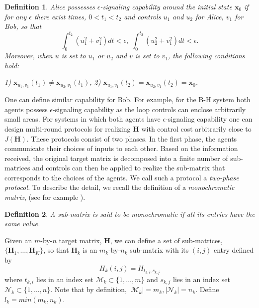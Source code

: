 \documentclass[12pt,onecolumn,draftcls]{IEEEtran}
\newcommand{\bx}{\mathbf{x}}
\newcommand{\bH}{\mathbf{H}}
\newtheorem{definition}{Definition}[section]
\begin{document}
\begin{definition}
Alice possesses $\epsilon$-signaling capability around the initial state $\bx_0$ if for any $\epsilon$ there exist times, $0 < t_1 < t_2$ and controls
$u_1$ and $u_2$ for Alice, $v_1$ for Bob, so that
\begin{equation}
\int_0^{t_2} (u_1^2+v_1^2)dt < \epsilon, \; \int_0^{t_2} (u_2^2+v_1^2)dt < \epsilon.
\end{equation}
Moreover, when $u$ is set to $u_1$ or $u_2$ and $v$ is set to $v_1$, the following conditions hold:

\noindent
{\rm 1)} $\bx_{u_1,v_1}(t_1) \neq \bx_{u_2,v_1}(t_1)$,
{\rm 2)} $\bx_{u_1,v_1}(t_2)=\bx_{u_2,v_1}(t_2)=\bx_0$.

\end{definition}
One can define similar capability for Bob.  For example, for the B-H system both agents
possess $\epsilon$-signaling capability as the loop controls can enclose arbitrarily small areas.
For systems in which both agents have $\epsilon$-signaling capability one can design
multi-round protocols for realizing $\bH$ with control cost arbitrarily close to $J(\bH)$.
These protocols consist of two phases.
In the first phase, the agents communicate their choices of inputs to each other.
Based on the information received, the original target matrix is decomposed into a finite number
of sub-matrices and controls can then be applied to realize the sub-matrix that corresponds to the
choices of the agents.  We call such a protocol a {\em two-phase protocol.}
To describe the detail, we recall the definition of a {\em monochromatic matrix}, (see for example \cite{KN}).

\begin{definition}
A sub-matrix is said to be monochromatic if all its entries have the same value.
\end{definition}

Given an $m$-by-$n$ target matrix, $\mathbf{H}$, we can define a set of sub-matrices, $\{ \mathbf{H}_1, \ldots, \mathbf{H}_K \}$,
so that $ \mathbf{H}_k$ is an $m_k$-by-$n_k$ sub-matrix with its $(i,j)$ entry defined by
\begin{equation}
H_k (i,j)= H_{t_{k,i}, s_{k,j}}
\end{equation}
where $t_{k,i}$ lies in an index set $\mathcal{M}_k \subset \{1, \ldots, m \}$
and $s_{k,j}$ lies in an index set $\mathcal{N}_k \subset \{1, \ldots, n \}$.   Note that by definition,
$|\mathcal{M}_k|=m_k,  |\mathcal{N}_k| =n_k$.   Define $l_k = min (m_k, n_k)$.
\end{document}
